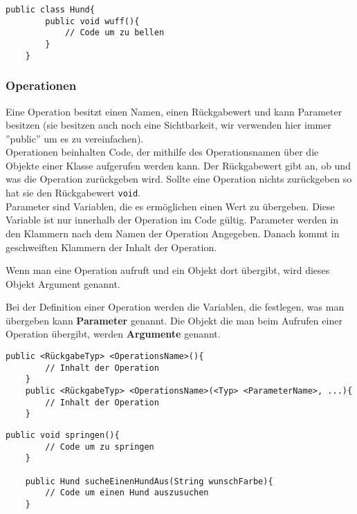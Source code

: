 \begin{lstlisting}[title=\textbf{Klassen Beispiel}]
	public class Hund{
		public void wuff(){
			// Code um zu bellen
		}
	}
\end{lstlisting}
\begin{Infobox}
	\subsubsection*{Operationen}
	Eine Operation besitzt einen Namen, einen Rückgabewert und kann Parameter besitzen (sie besitzen auch noch eine Sichtbarkeit, wir verwenden hier immer ''public'' um es zu vereinfachen).\\
	Operationen beinhalten Code, der mithilfe des Operationsnamen über die Objekte einer Klasse aufgerufen werden kann.
	Der Rückgabewert gibt an, ob und was die Operation zurückgeben wird.
	Sollte eine Operation nichts zurückgeben so hat sie den Rückgabewert \lstinline{void}.\\
	Parameter sind Variablen, die es ermöglichen einen Wert zu übergeben. Diese Variable ist nur innerhalb der Operation im Code gültig.
	Parameter werden in den Klammern nach dem Namen der Operation Angegeben.
	Danach kommt in geschweiften Klammern der Inhalt der Operation.
	
	Wenn man eine Operation aufruft und ein Objekt dort übergibt, wird dieses Objekt Argument genannt.
\end{Infobox}
\vspace{5mm}

\begin{Infobox}
	Bei der Definition einer Operation werden die Variablen, die festlegen, was man übergeben kann \textbf{Parameter} genannt. Die Objekt die man beim Aufrufen einer Operation übergibt, werden \textbf{Argumente} genannt. 
\end{Infobox}

\begin{lstlisting}[title=\textbf{Operations Syntax}]
	public <RückgabeTyp> <OperationsName>(){
		// Inhalt der Operation
	}
	public <RückgabeTyp> <OperationsName>(<Typ> <ParameterName>, ...){
		// Inhalt der Operation
	}
\end{lstlisting}

\begin{lstlisting}[title=\textbf{Operations Beispiel}]
	public void springen(){
		// Code um zu springen
	}
	
	public Hund sucheEinenHundAus(String wunschFarbe){
		// Code um einen Hund auszusuchen
	}
\end{lstlisting}

